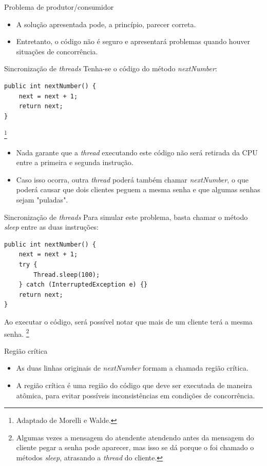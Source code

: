 \documentclass[11pt,justified]{beamer}
\newcommand\blfootnote[1]{%
  \begingroup
  \renewcommand\thefootnote{}\footnote{#1}%
  \addtocounter{footnote}{-1}%
  \endgroup
}
\begin{document}
\begin{frame}{Problema de produtor/consumidor}
    \begin{itemize}
        \item A solução apresentada pode, a princípio, parecer correta.
        \item Entretanto, o código não é seguro e apresentará problemas quando houver situações de concorrência.
    \end{itemize}
\end{frame}

\begin{frame}[fragile]{Sincronização de \textit{threads}}
    Tenha-se o código do método \textit{nextNumber}:
    \begin{lstlisting}
public int nextNumber() {
    next = next + 1;
    return next;
}
    \end{lstlisting}\blfootnote{Adaptado de Morelli e Walde.}
    \begin{itemize}
        \item Nada garante que a \textit{thread} executando este código não será retirada da CPU entre a primeira e segunda instrução.
        \item Caso isso ocorra, outra \textit{thread} poderá também chamar \textit{nextNumber}, o que poderá causar que dois clientes peguem a mesma senha e que algumas senhas sejam "puladas".
    \end{itemize}
\end{frame}

\begin{frame}[fragile]{Sincronização de \textit{threads}}
    Para simular este problema, basta chamar o método \textit{sleep} entre as duas instruções:
    \begin{lstlisting}
public int nextNumber() {
    next = next + 1;
    try {
        Thread.sleep(100);
    } catch (InterruptedException e) {}
    return next;
}
    \end{lstlisting}
    Ao executar o código, será possível notar que mais de um cliente terá a mesma senha.\blfootnote{Algumas vezes a mensagem do atendente atendendo antes da mensagem do cliente pegar a senha pode aparecer, mas isso se dá porque o foi chamado o métodos \textit{sleep}, atrasando a \textit{thread} do cliente.}
\end{frame}

\begin{frame}{Região crítica}
    \begin{itemize}
        \item As duas linhas originais de \textit{nextNumber} formam a chamada região crítica.
        \item A região crítica é uma região do código que deve ser executada de maneira atômica, para evitar possíveis inconsistências em condições de concorrência.
    \end{itemize}
\end{frame}
\end{document}
